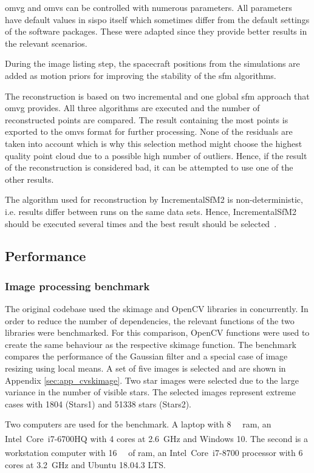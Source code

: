 \gls{omvg} and \gls{omvs} can be controlled with numerous parameters. All parameters have default values in \gls{sispo} itself which sometimes differ from the default settings of the software packages. These were adapted since they provide better results in the relevant scenarios.

During the image listing step, the spacecraft positions from the simulations are added as motion priors for improving the stability of the \gls{sfm} algorithms.

The reconstruction is based on two incremental and one global \gls{sfm} approach that \gls{omvg} provides. All three algorithms are executed and the number of reconstructed points are compared. The result containing the most points is exported to the \gls{omvs} format for further processing. None of the residuals are taken into account which is why this selection method might choose the highest quality point cloud due to a possible high number of outliers. Hence, if the result of the reconstruction is considered bad, it can be attempted to use one of the other results.

The algorithm used for reconstruction by IncrementalSfM2 is non-deterministic, i.e. results differ between runs on the same data sets. Hence, IncrementalSfM2 should be executed several times and the best result should be selected~\cite{Pajusalu2019CharacterizationMapping}.

\subsection{Performance}
\subsubsection{Image processing benchmark} \label{sec:cvskimage}
The original codebase used the \gls{skimage} and OpenCV libraries in concurrently. In order to reduce the number of dependencies, the relevant functions of the two libraries were benchmarked. For this comparison, OpenCV functions were used to create the same behaviour as the respective \gls{skimage} function. The benchmark compares the performance of the Gaussian filter and a special case of image resizing using local means. A set of five images is selected and are shown in Appendix \ref{sec:app_cvskimage}. Two star images were selected due to the large variance in the number of visible stars. The selected images represent extreme cases with 1804 (Stars1) and 51338 stars (Stars2).

Two computers are used for the benchmark. A laptop with \SI{8}{\giga\byte} \gls{ram}, an Intel\textsuperscript{\textregistered}~Core\texttrademark~i7-6700HQ with \SI{4}{} cores at \SI{2.6}{\giga\hertz} and Windows 10. The second is a workstation computer with \SI{16}{\giga\byte} of \gls{ram}, an Intel\textsuperscript{\textregistered}~Core\texttrademark~i7-8700 processor with \SI{6}{} cores at \SI{3.2}{\giga\hertz} and Ubuntu 18.04.3 LTS.

